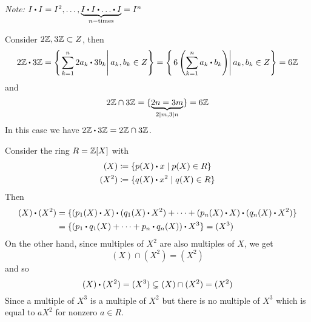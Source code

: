 \documentclass[../Main.tex]{subfiles}
\begin{document}
\textit{Note:} $I\rdot I=I^2, \dots, \underbrace{I\rdot I\rdot \dots \rdot I}_{n-\text{times}}=I^n$
\begin{example}
	Consider $2\mathbb{Z}, 3\mathbb{Z} \subset Z$, then
	\[2\Z\rdot 3\Z = \left\{ \left. \sum_{k=1}^n 2a_k\rdot 3b_k\right| a_k,b_k\in Z\right\} = \left\{ \left.6\left(\sum_{k=1}^n a_k\rdot b_k\right)\right| a_k,b_k\in Z\right\}=6\Z\]
	and
	\[2\mathbb{Z}\cap 3\mathbb{Z} = \{\underbrace{2n=3m}_{2|m,3|n}\}=6\mathbb{Z}\]
In this case we have $2\Z\rdot 3\Z=2\Z\cap 3\Z$.
\end{example}
\newpage
\begin{example}
	Consider the ring $R=\mathbb{Z}[X]$ with
	\begin{align*}
	(X)&\coloneqq\{p(X)\rdot x\mid p(X)\in R\}\\
	(X^2)&\coloneqq \{q(X)\rdot x^2\mid q(X)\in R\}
	\end{align*}
	Then
	\begin{align*}
	(X)\rdot (X^2)&=\{(p_1(X)\rdot X)\rdot (q_1(X)\rdot X^2)+\dots+(p_n(X)\rdot X)\rdot (q_n(X)\rdot X^2)\}\\ &= \{(p_1\rdot q_1(X)+\dots+p_n\rdot q_n(X))\rdot X^3\}=(X^3)
	\end{align*}
	On the other hand, since multiples of $X^2$ are also multiples of $X$, we get
	\[(X)\cap(X^2) = (X^2)\]
	and so
	\[(X)\rdot (X^2)=(X^3)\subsetneq(X)\cap(X^2)=(X^2)\]
	Since a multiple of $X^3$ is a multiple of $X^2$ but there is no multiple of $X^3$ which is equal to $aX^2$ for nonzero $a \in R$.
\end{example}
\end{document}
